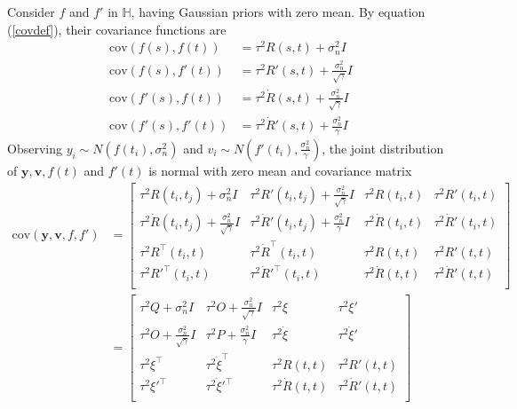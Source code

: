 Consider $f$ and $f'$ in $\mathbb{H}$, having Gaussian priors with zero mean. By equation  (\ref{covdef}), their covariance functions are
\begin{equation}
\begin{split}
\text{cov}(f(s),f(t))&=\tau^2 R(s,t)+\sigma_n^2I\\
\text{cov}(f(s),f'(t))&=\tau^2 R'(s,t)+\frac{\sigma_n^2}{\sqrt{\gamma}}I\\
\text{cov}(f'(s),f(t))&=\tau^2 \dot{R}(s,t)+\frac{\sigma_n^2}{\sqrt{\gamma}}I\\
\text{cov}(f'(s),f'(t))&=\tau^2 \dot{R}'(s,t)+\frac{\sigma_n^2}{\gamma}I
\end{split}
\end{equation}
Observing $y_i \sim N(f(t_i),\sigma_n^2)$ and $v_i \sim N(f'(t_i),\frac{\sigma_n^2}{\gamma})$, the joint distribution of $\mathbf{y}, \mathbf{v}, f(t)$ and $f'(t)$ is normal with zero mean and covariance matrix
\begin{equation}\label{covyvff}
\begin{split}
\text{cov}(\mathbf{y},\mathbf{v},f,f') &= 
\left[ \begin{matrix}
\tau^2R(t_i,t_j)+\sigma_n^2I & \tau^2R'(t_i,t_j)+\frac{\sigma_n^2}{\sqrt{\gamma}}I & \tau^2R(t_i,t)& \tau^2R'(t_i,t) \\
\tau^2 \dot{R}(t_i,t_j)+\frac{\sigma_n^2}{\sqrt{\gamma}}I & \tau^2 \dot{R}'(t_i,t_j)+\frac{\sigma_n^2}{\gamma}I & \tau^2 \dot{R}(t_i,t)& \tau^2\dot{R}'(t_i,t)  \\
\tau^2R^\top(t_i,t) & \tau^2\dot{R}^\top(t_i,t) & \tau^2R(t,t)& \tau^2R'(t,t) \\
 \tau^2R'^\top(t_i,t)& \tau^2\dot{R}'^\top(t_i,t)& \tau^2\dot{R}(t,t)& \tau^2\dot{R}'(t,t)  \\
\end{matrix} \right] \\
&=
\left[ \begin{matrix}
\tau^2Q+\sigma_n^2I & \tau^2 O+\frac{\sigma_n^2}{\sqrt{\gamma}}I & \tau^2\xi & \tau^2\xi' \\
\tau^2 O+\frac{\sigma_n^2}{\sqrt{\gamma}}I & \tau^2 P+\frac{\sigma_n^2}{\gamma}I & \tau^2 \dot{\xi}& \tau^2\dot{\xi}' \\
\tau^2\xi^\top & \tau^2\dot{\xi}^\top & \tau^2R(t,t)& \tau^2R'(t,t) \\
 \tau^2\xi'^\top& \tau^2\dot{\xi}'^\top& \tau^2\dot{R}(t,t)& \tau^2\dot{R}'(t,t)  \\
\end{matrix} \right]
\end{split}
\end{equation}
